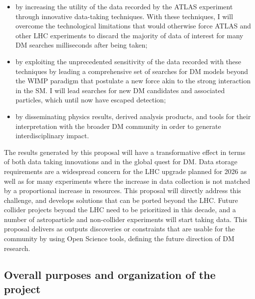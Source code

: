 \documentclass[11pt,a4paper]{article}
\begin{document}
\begin{itemize}
	\item by increasing the utility of the data recorded by the ATLAS experiment through innovative data-taking techniques. With these techniques, I will overcome the technological limitations that would otherwise force ATLAS and other LHC experiments to discard the majority of data of interest for many DM searches milliseconds after being taken;
	\item by exploiting the unprecedented sensitivity of the data recorded with these techniques by leading a comprehensive set of searches for DM models beyond the WIMP paradigm that postulate a new force akin to the strong interaction in the SM. I will lead searches for new DM candidates and associated particles, which until now have escaped detection; %
	\item by disseminating physics results, derived analysis products, and tools for their interpretation with the broader DM community in order to generate interdisciplinary impact. 
\end{itemize}

The results generated by this proposal will have a transformative effect in terms of both data taking innovations and in the global quest for DM. 
Data storage requirements are a widespread concern for the LHC upgrade planned for 2026 as well as for many experiments where the increase in data collection is not matched by a proportional increase in resources. 
This proposal will directly address this challenge, and develops solutions that can be ported beyond the LHC. 
Future collider projects beyond the LHC need to be prioritized in this decade, and a number of astroparticle and non-collider experiments will start taking data. 
This proposal delivers as outputs discoveries or constraints that are usable for the community by using Open Science tools, defining the future direction of DM research.  


\subsection{Overall purposes and organization of the project} 
\end{document}
